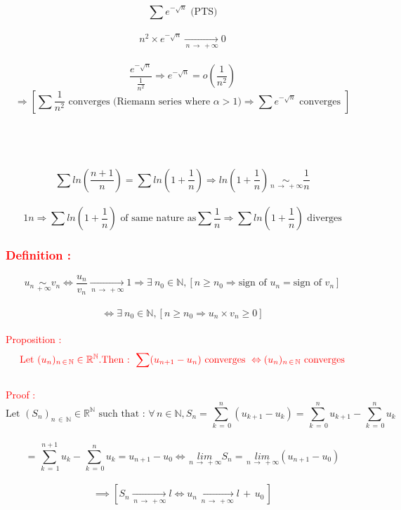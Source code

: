 \documentclass[a4paper,12pt]{article}
\begin{document}
\\
\[
\sum e^{-\sqrt{n}} \text{ (PTS)}
\]\\
\[
n^2 \times e^{-\sqrt{n}}  \underset{\,n \,\to\, +\infty}{\to} 0
\] \\
\[
\frac{e^{-\sqrt{n}}}{\frac{1}{n^2}} \Rightarrow e^{-\sqrt{n}} = o(\frac{1}{n^2}) 
\]
\[\Rightarrow [\sum \frac{1}{n^2} \text{ converges (Riemann series where } \alpha > 1\text{)} \Rightarrow \sum  e^{-\sqrt{n}} \text{ converges } ]
\]
\\
\\
{}\\

 \\
\[
\sum ln(\frac{n+1}{n}) = \sum ln(1 + \frac{1}{n}) \Rightarrow ln(1+\frac{1}{n}) \underset{\,n \,\to \, +\infty}{\sim} \frac{1}{n}
\] \\
\[{1}{n}
\Rightarrow \sum ln(1+\frac{1}{n}) \text{ of same nature as} \sum \frac{1}{n} \Rightarrow \sum ln(1+\frac{1}{n}) \text{ diverges}
\]
\bigskip
\textcolor{red}{\subsubsection*{Definition :}}
\[
u_n \underset{\,+\infty}{\sim} v_n \Leftrightarrow \frac{u_n}{v_n} \underset{\,n \,\to\, +\infty}{\to} 1 \Rightarrow \exists \: n_0 \in \mathbb{N}, [n\ge n_0 \Rightarrow \text{sign of } u_n = \text{sign of } v_n] 
\] \\
\[
\Leftrightarrow \exists \: n_0 \in \mathbb{N}, [n \ge n_0 \Rightarrow u_n \times v_n \ge 0]
\]
\\
\textcolor{red}{Proposition :} \\

\[
\textcolor{red}{\text{Let } (u_n)_{n \,\in \,\mathbb{N}} \in \mathbb{R}^\mathbb{N}. \text{Then : }\sum(u_{n+1} -u_n) \text{ converges } \Leftrightarrow  (u_n)_{n\, \in\,\mathbb{N}} \text{ converges} }
\]\\

\textcolor{red}{Proof :}
\[
\text{Let } (S_n)_{n \,\in \,\mathbb{N}} \in \mathbb{R}^\mathbb{N} \text{ such that : }
\forall \, n \in \mathbb{N}, S_n = \sum_{\,k\,=\,0}^{n}{(u_{k+1} - {u_k}) = \sum_{\,k\,=\,0}^{n}{u_{k+1}} - \sum_{\,k\,=\,0}^{n}{u_{k}}} 
\]\\
\[
= \sum_{\,k\,=\,1}^{n+1}{u_{k}} - \sum_{\,k\,=\,0}^{n}{u_{k}} = u_{n+1} - u_{0} \Leftrightarrow \underset{\,n\, \to \,+\infty}{lim} S_n = \underset{\,n\, \to \,+\infty}{lim} (u_{n+1} - u_0)
\]\\
\bigskip	
\[
\implies [S_n \underset{\,n\,\to\,+\infty}{\to} l \Leftrightarrow u_n \underset{\,n\,\to\,+\infty}{\to} l\, +\,u_0\,]
\]
\newpage
{} \\
\end{document}
